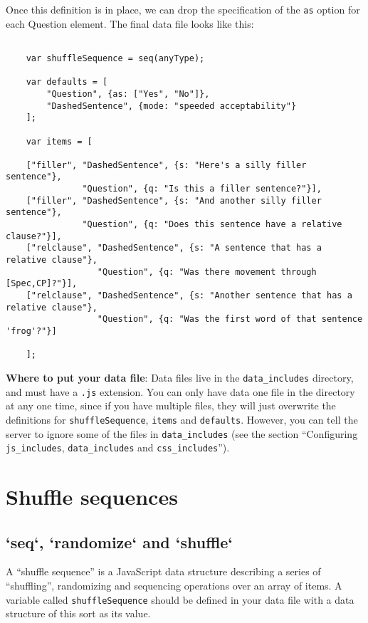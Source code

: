 \documentclass[11pt,letterpaper]{article}
\begin{document}
Once this definition is in place, we can drop the specification of the \texttt{as}
option for each Question element. The final data file looks like this:
\footnotesize\begin{verbatim}

    var shuffleSequence = seq(anyType);

    var defaults = [
        "Question", {as: ["Yes", "No"]},
        "DashedSentence", {mode: "speeded acceptability"}
    ];

    var items = [

    ["filler", "DashedSentence", {s: "Here's a silly filler sentence"},
               "Question", {q: "Is this a filler sentence?"}],
    ["filler", "DashedSentence", {s: "And another silly filler sentence"},
               "Question", {q: "Does this sentence have a relative clause?"}],
    ["relclause", "DashedSentence", {s: "A sentence that has a relative clause"},
                  "Question", {q: "Was there movement through [Spec,CP]?"}],
    ["relclause", "DashedSentence", {s: "Another sentence that has a relative clause"},
                  "Question", {q: "Was the first word of that sentence 'frog'?"}]

    ];
\end{verbatim}

\smallskip\noindent\normalsize

\textbf{Where to put your data file}: Data files live in the \texttt{data\_includes}
directory, and must have a \texttt{.js} extension. You can only have data one file in
the directory at any one time, since if you have multiple files, they will just
overwrite the definitions for \texttt{shuffleSequence}, \texttt{items} and \texttt{defaults}.
However, you can tell the server to ignore some of the files in \texttt{data\_includes}
(see the section ``Configuring \texttt{js\_includes}, \texttt{data\_includes} and \texttt{css\_includes}'').

\section{Shuffle sequences}

\subsection{`seq`, `randomize` and `shuffle`}


A ``shuffle sequence'' is a JavaScript data structure describing a series of
``shuffling'', randomizing and sequencing operations over an array of items.  A
variable called \texttt{shuffleSequence} should be defined in your data file with a
data structure of this sort as its value.
\end{document}
